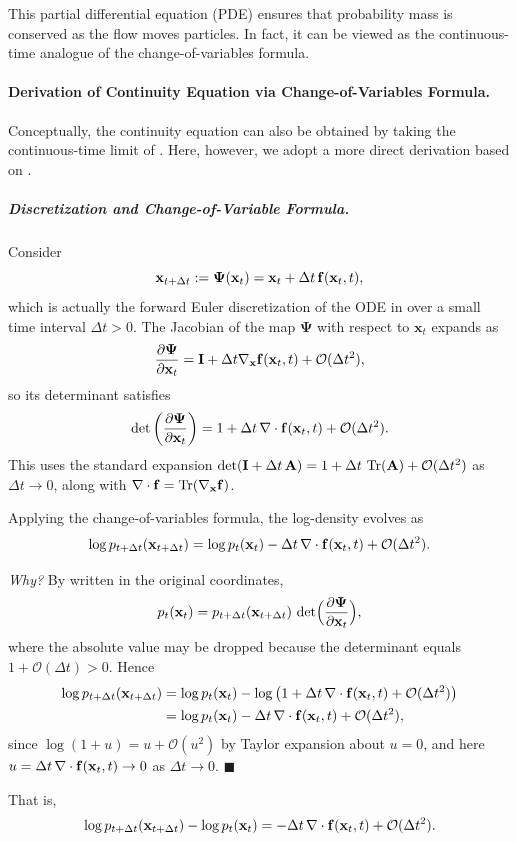 This partial differential equation (PDE) ensures that probability mass is conserved as the flow moves particles.  
In fact, it can be viewed as the continuous-time analogue of the change-of-variables formula.


\paragraph{Derivation of Continuity Equation via  Change-of-Variables Formula.} Conceptually, the continuity equation can also be obtained by taking the continuous-time limit of . Here, however, we adopt a more direct derivation based on .
\subparagraph{Discretization and Change-of-Variable Formula.}
Consider 
\[
\mathbf{x}_{t+\Delta t} := \bm{\Psi}(\mathbf{x}_t) = \mathbf{x}_t + \Delta t\, {\mathbf{f}}(\mathbf{x}_t, t),
\]
which is actually the forward Euler discretization of the ODE in  over a small time interval $\Delta t > 0$.
The Jacobian of the map $\bm{\Psi}$ with respect to $\mathbf{x}_t$ expands as
\[
\frac{\partial \bm{\Psi}}{\partial \mathbf{x}_t} = {\mathbf{I}} + \Delta t \nabla_{\mathbf{x}} {\mathbf{f}}(\mathbf{x}_t, t) + \mathcal{O}(\Delta t^2),
\]
so its determinant satisfies
\[
\det\left( \frac{\partial \bm{\Psi}}{\partial \mathbf{x}_t} \right) = 1 + \Delta t\, \nabla \cdot {\mathbf{f}}(\mathbf{x}_t, t) + \mathcal{O}(\Delta t^2).
\]
This uses the standard expansion $\det({\mathbf{I}} + \Delta t\, \mathbf{A}) = 1 + \Delta t\, \operatorname{Tr}(\mathbf{A}) + \mathcal{O}(\Delta t^2)$ as $\Delta t \to 0$, along with $\nabla \cdot {\mathbf{f}} = \operatorname{Tr}(\nabla_{\mathbf{x}} {\mathbf{f}})$.

Applying the change-of-variables formula, the log-density evolves as
\begin{align*}
\log p_{t+\Delta t}(\mathbf{x}_{t+\Delta t}) = \log p_t(\mathbf{x}_t) - \Delta t\, \nabla \cdot {\mathbf{f}}(\mathbf{x}_t, t) + \mathcal{O}(\Delta t^2).
\end{align*}
\begin{nknote}
\noindent\textit{Why?} By  written in the original coordinates,
\[
p_t({\mathbf{x}}_t) = p_{t+\Delta t}({\mathbf{x}}_{t+\Delta t})\,\det\!\Big(\frac{\partial \bm{\Psi}}{\partial {\mathbf{x}}_t}\Big),
\]
where the absolute value may be dropped because the determinant equals $1 + \mathcal{O}(\Delta t) > 0$. Hence
\begin{align*}
\log p_{t+\Delta t}({\mathbf{x}}_{t+\Delta t})
&= \log p_t({\mathbf{x}}_t) - \log\big(1 + \Delta t\,\nabla\cdot{\mathbf{f}}({\mathbf{x}}_t,t) + \mathcal{O}(\Delta t^2)\big) \\
&= \log p_t({\mathbf{x}}_t) - \Delta t\,\nabla\cdot{\mathbf{f}}({\mathbf{x}}_t,t) + \mathcal{O}(\Delta t^2),
\end{align*}
since $\log(1+u) = u + \mathcal{O}(u^2)$ by Taylor expansion about $u=0$, and here $u = \Delta t\,\nabla\cdot{\mathbf{f}}({\mathbf{x}}_t,t) \to 0$ as $\Delta t \to 0$. \hfill$\blacksquare$
\end{nknote}
That is,
\begin{align}
    \label{eq:log-density-diff}
\log p_{t+\Delta t}(\mathbf{x}_{t+\Delta t}) - \log p_t(\mathbf{x}_t) = - \Delta t\, \nabla \cdot {\mathbf{f}}(\mathbf{x}_t, t) + \mathcal{O}(\Delta t^2).
\end{align}

